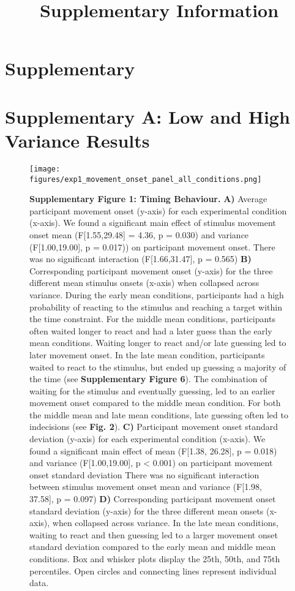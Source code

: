 \documentclass[man,floatsintext,letterpaper,12pt]{apa7}
\title{Supplementary Information}
\newcommand\boldblue[1]{\textcolor{mydarkblue}{\textbf{#1}}}
\begin{document}
\section{Supplementary}
\section{Supplementary A: Low and High Variance Results}
\begin{figure}[H]
    \centering
    \texttt{[image: figures/exp1\_movement\_onset\_panel\_all\_conditions.png]}
    \caption*{\boldblue{Supplementary Figure 1: Timing Behaviour.} \boldblue{A)} Average participant movement onset (y-axis) for each experimental condition (x-axis). We found a significant main effect of stimulus movement onset mean (F[1.55,29.48] = 4.36, p = 0.030) and variance (F[1.00,19.00], p = 0.017)) on participant movement onset. There was no significant interaction (F[1.66,31.47], p = 0.565) \boldblue{B)} Corresponding participant movement onset (y-axis) for the three different mean stimulus onsets (x-axis) when collapsed across variance. During the early mean conditions, participants had a high probability of reacting to the stimulus and reaching a target within the time constraint. For the middle mean conditions, participants often waited longer to react and had a later guess than the early mean conditions. Waiting longer to react and/or late guessing led to later movement onset. In the late mean condition, participants waited to react to the stimulus, but ended up guessing a majority of the time (see \boldblue{Supplementary Figure 6}). The combination of waiting for the stimulus and eventually guessing, led to an earlier movement onset compared to the middle mean condition. For both the middle mean and late mean conditions, late guessing often led to indecisions (see \boldblue{Fig. 2}). \boldblue{C)} Participant movement onset standard deviation (y-axis) for each experimental condition (x-axis). We found a significant main effect of mean (F[1.38, 26.28], p = 0.018) and variance (F[1.00,19.00], p < 0.001) on participant movement onset standard deviation There was no significant interaction between stimulus movement onset mean and variance (F[1.98, 37.58], p = 0.097) \boldblue{D)} Corresponding participant movement onset standard deviation (y-axis) for the three different mean onsets (x-axis), when collapsed across variance. In the late mean conditions, waiting to react and then guessing led to a larger movement onset standard deviation compared to the early mean and middle mean conditions. Box and whisker plots display the 25th, 50th, and 75th percentiles. Open circles and connecting lines represent individual data.}
\end{figure}
\end{document}
